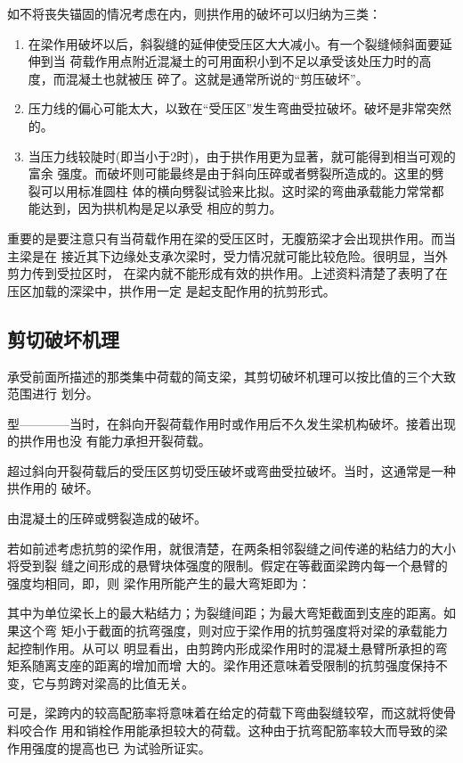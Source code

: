 \documentclass[12pt,a4paper]{book}
\begin{document}
如不将丧失锚固的情况考虑在内，则拱作用的破坏可以归纳为三类：
\begin{enumerate}
\item 在梁作用破坏以后，斜裂缝的延伸使受压区大大减小。有一个裂缝倾斜面要延伸到当
  荷载作用点附近混凝土的可用面积小到不足以承受该处压力时的高度，而混凝土也就被压
  碎了。这就是通常所说的“剪压破坏”。
\item 压力线的偏心可能太大，以致在“受压区”发生弯曲受拉破坏。破坏是非常突然的。
\item 当压力线较陡时(即当小于2时)，由于拱作用更为显著，就可能得到相当可观的富余
  强度。而破坏则可能最终是由于斜向压碎或者劈裂所造成的。这里的劈裂可以用标准圆柱
  体的横向劈裂试验来比拟。这时梁的弯曲承载能力常常都能达到，因为拱机构是足以承受
  相应的剪力。
\end{enumerate}

重要的是要注意只有当荷载作用在梁的受压区时，无腹筋梁才会出现拱作用。而当主梁是在
接近其下边缘处支承次梁时，受力情况就可能比较危险。很明显，当外剪力传到受拉区时，
在梁内就不能形成有效的拱作用。上述资料清楚了表明了在压区加载的深梁中，拱作用一定
是起支配作用的抗剪形式。

\subsection{剪切破坏机理}

承受前面所描述的那类集中荷载的简支梁，其剪切破坏机理可以按比值的三个大致范围进行
划分。

型————当时，在斜向开裂荷载作用时或作用后不久发生梁机构破坏。接着出现的拱作用也没
有能力承担开裂荷载。

超过斜向开裂荷载后的受压区剪切受压破坏或弯曲受拉破坏。当时，这通常是一种拱作用的
破坏。

由混凝土的压碎或劈裂造成的破坏。

若如前述考虑抗剪的梁作用，就很清楚，在两条相邻裂缝之间传递的粘结力的大小将受到裂
缝之间形成的悬臂块体强度的限制。假定在等截面梁跨内每一个悬臂的强度均相同，即，则
梁作用所能产生的最大弯矩即为：

其中为单位梁长上的最大粘结力；为裂缝间距；为最大弯矩截面到支座的距离。如果这个弯
矩小于截面的抗弯强度，则对应于梁作用的抗剪强度将对梁的承载能力起控制作用。从可以
明显看出，由剪跨内形成梁作用时的混凝土悬臂所承担的弯矩系随离支座的距离的增加而增
大的。梁作用还意味着受限制的抗剪强度保持不变，它与剪跨对梁高的比值无关。

可是，梁跨内的较高配筋率将意味着在给定的荷载下弯曲裂缝较窄，而这就将使骨料咬合作
用和销栓作用能承担较大的荷载。这种由于抗弯配筋率较大而导致的梁作用强度的提高也已
为试验所证实。
\end{document}
